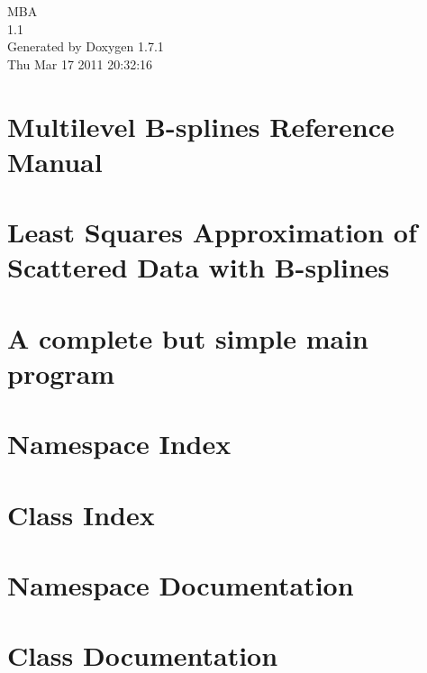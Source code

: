 \documentclass[a4paper]{book}
\begin{document}
\begin{titlepage}
\vspace*{7cm}
\begin{center}
{\Large MBA \\[1ex]\large 1.1 }\\
\vspace*{1cm}
{\large Generated by Doxygen 1.7.1}\\
\vspace*{0.5cm}
{\small Thu Mar 17 2011 20:32:16}\\
\end{center}
\end{titlepage}
\clearemptydoublepage
{}
\tableofcontents
\clearemptydoublepage
{}
\chapter{Multilevel B-\/splines Reference Manual}
\label{index}
\chapter{Least Squares Approximation of Scattered Data with B-\/splines}
\label{lsmglib}

\chapter{A complete but simple main program}
\label{mainsimplest}

\chapter{Namespace Index}

\chapter{Class Index}

\chapter{Namespace Documentation}

\chapter{Class Documentation}










\printindex
\end{document}

